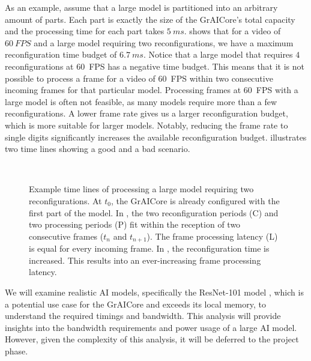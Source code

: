 As an example, assume that a large model is partitioned into an arbitrary amount of parts.
Each part is exactly the size of the GrAICore's total capacity and the processing time for each part takes $\SI{5}{ms}$.
 shows that for a video of $\SI{60}{FPS}$ and a large model requiring two reconfigurations, we have a maximum reconfiguration time budget of $\SI{6.7}{ms}$.
Notice that a large model that requires $4$ reconfigurations at \SI{60}{FPS} has a negative time budget.
This means that it is not possible to process a frame for a video of \SI{60}{FPS} within two consecutive incoming frames for that particular model.
Processing frames at \SI{60}{FPS} with a large model is often not feasible, as many models require more than a few reconfigurations.
A lower frame rate gives us a larger reconfiguration budget, which is more suitable for larger models.
Notably, reducing the frame rate to single digits significantly increases the available reconfiguration budget.
 illustrates two time lines showing a good and a bad scenario.

\begin{figure}[htbp]
    \centering
    \subfloat[]{
        
        \label{fig:large_reconfig_ex1}
    } \\
    \subfloat[]{
        
        \label{fig:large_reconfig_ex2}
    }
    \caption{
        Example time lines of processing a large model requiring two reconfigurations.
        At $t_0$, the GrAICore is already configured with the first part of the model.
        In \protect{}, the two reconfiguration periods (C) and two processing periods (P) fit within the reception of two consecutive frames ($t_n$ and $t_{n+1}$).
        The frame processing latency (L) is equal for every incoming frame.
        In \protect{}, the reconfiguration time is increased. 
        This results into an ever-increasing frame processing latency.
    }
    \label{fig:larger_reconfig_ex}
\end{figure}

We will examine realistic AI models, specifically the ResNet-101 model \cite{heDeepResidualLearning2015}, which is a potential use case for the GrAICore and exceeds its local memory, to understand the required timings and bandwidth.
This analysis will provide insights into the bandwidth requirements and power usage of a large AI model.
However, given the complexity of this analysis, it will be deferred to the project phase.

